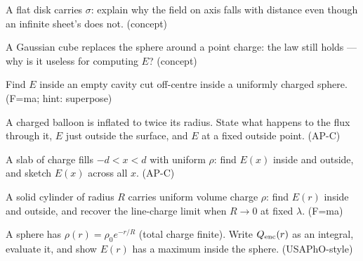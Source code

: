 \begin{exercise}[medium]
A flat disk carries $\sigma$: explain why the field on axis falls with
distance even though an infinite sheet's does not. (concept)
\end{exercise}
\begin{exercise}[medium]
A Gaussian cube replaces the sphere around a point charge: the law
still holds --- why is it useless for computing $E$? (concept)
\end{exercise}
\begin{exercise}[medium]
Find $E$ inside an empty cavity cut off-centre inside a uniformly
charged sphere. (F=ma; hint: superpose)
\end{exercise}
\begin{exercise}[easy]
A charged balloon is inflated to twice its radius. State what happens
to the flux through it, $E$ just outside the surface, and $E$ at a
fixed outside point. (AP-C)
\end{exercise}
\begin{exercise}[medium]
A slab of charge fills $-d<x<d$ with uniform $\rho$: find $E(x)$
inside and outside, and sketch $E(x)$ across all $x$. (AP-C)
\end{exercise}
\begin{exercise}[medium]
A solid cylinder of radius $R$ carries uniform volume charge $\rho$:
find $E(r)$ inside and outside, and recover the line-charge limit
when $R\to0$ at fixed $\lambda$. (F=ma)
\end{exercise}
\begin{exercise}[hard]
A sphere has $\rho(r)=\rho_0e^{-r/R}$ (total charge finite). Write
$Q_{\rm enc}(r)$ as an integral, evaluate it, and show $E(r)$ has a
maximum inside the sphere. (USAPhO-style)
\end{exercise}
